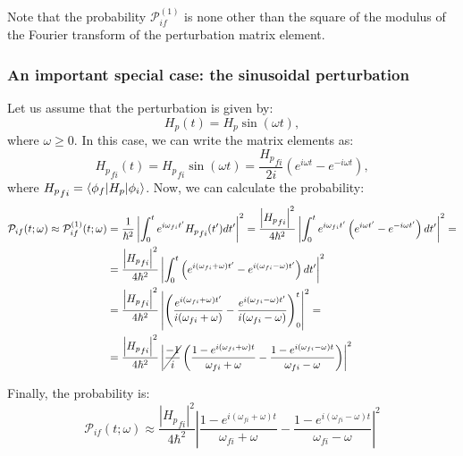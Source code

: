 Note that the probability $\mathcal{P}_{if}^{(1)}$ is none other than the square of the modulus of the Fourier transform of the perturbation matrix element.

\subsubsection{An important special case: the sinusoidal perturbation}

Let us assume that the perturbation is given by:
\begin{equation}
    H_p(t) = H_p\sin(\omega t),
\end{equation}
where $\omega \geq 0$. In this case, we can write the matrix elements as:
\begin{equation}
    {H_p}_{fi}(t) = {H_p}_{fi} \sin(\omega t) = \frac{{H_p}_{fi}}{2i} \left( e^{i\omega t} - e^{-i\omega t} \right),
\end{equation}
where ${H_p}_{fi} = \braket{\phi_f|H_p|\phi_i}$. Now, we can calculate the probability:
\begin{equation}
    \begin{split}
        \mathcal{P}_{if}(t;\omega) \approx \mathcal{P}_{if}^{(1)}(t;\omega) &= \frac{1}{\hbar^2}\left|\int_0^t e^{i\omega_{fi}t'}{H_p}_{fi}(t')dt' \right|^2 = \frac{\left|{H_p}_{fi}\right|^2}{4\hbar^2}\left|\int_0^t e^{i\omega_{fi}t'} \left( e^{i\omega t'} - e^{-i\omega t'} \right)dt' \right|^2 =\\
        &= \frac{\left|{H_p}_{fi}\right|^2}{4\hbar^2}\left|\int_0^t \left( e^{i(\omega_{fi} + \omega) t'} - e^{i(\omega_{fi} - \omega) t'} \right)dt' \right|^2\\
        &= \frac{\left|{H_p}_{fi}\right|^2}{4\hbar^2}\left|\left(\frac{e^{i(\omega_{fi} + \omega) t'}}{i(\omega_{fi} + \omega)} - \frac{e^{i(\omega_{fi} - \omega) t'}}{i(\omega_{fi} - \omega)}\right)_0^t \right|^2 =\\
        &= \frac{\left|{H_p}_{fi}\right|^2}{4\hbar^2}\left|\cancel{\frac{-1}{i}}\left(\frac{1-e^{i(\omega_{fi} + \omega) t}}{\omega_{fi} + \omega} - \frac{1-e^{i(\omega_{fi} - \omega) t}}{\omega_{fi} - \omega}\right) \right|^2
    \end{split}
\end{equation}

Finally, the probability is:
\begin{equation}\label{prob_sinusoidal}
    \mathcal{P}_{if}(t;\omega) \approx \frac{\left|{H_p}_{fi}\right|^2}{4\hbar^2}\left|\frac{1-e^{i(\omega_{fi} + \omega) t}}{\omega_{fi} + \omega} - \frac{1-e^{i(\omega_{fi} - \omega) t}}{\omega_{fi} - \omega} \right|^2
\end{equation}

